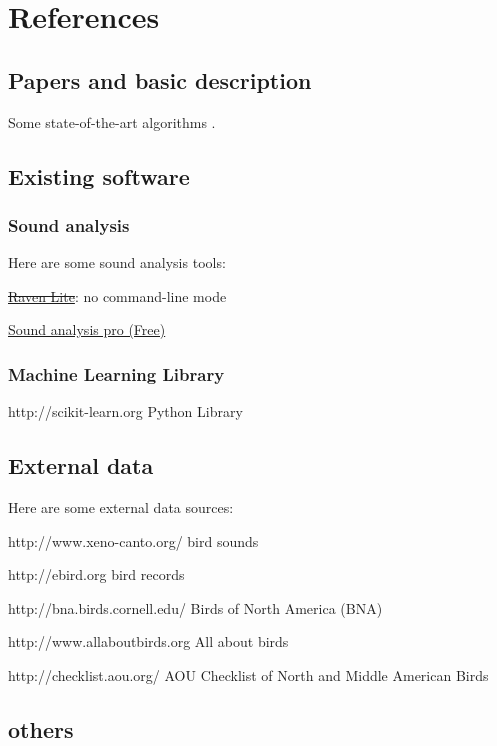 \section{References}

\subsection{Papers and basic description}

Some state-of-the-art algorithms \cite{briggs2013instance,Lasseck13,Massaron13,stattnersong13}.

\subsection{Existing software}

\subsubsection{Sound analysis}

Here are some sound analysis tools:

\sout{\href{http://www.birds.cornell.edu/brp/raven/ravenoverview.html} {Raven Lite}}: no command-line mode

\href{http://ofer.sci.ccny.cuny.edu/sound_analysis_pro} {Sound analysis pro (Free)}



\subsubsection{Machine Learning Library}

http://scikit-learn.org Python Library

\subsection{External data}

Here are some external data sources:

http://www.xeno-canto.org/ bird sounds

http://ebird.org  bird records

http://bna.birds.cornell.edu/ Birds of North America (BNA) 

http://www.allaboutbirds.org All about birds

http://checklist.aou.org/        AOU Checklist of North and Middle American Birds


\subsection{others}

